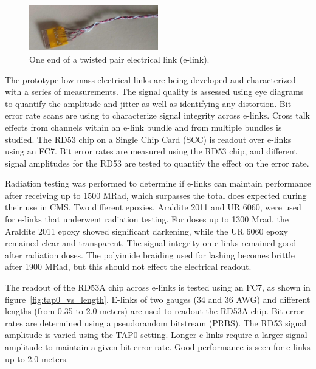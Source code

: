 \documentclass[a4paper,11pt]{article}
\begin{document}
\begin{figure}[htbp]
\centering
\includegraphics[width=0.5\textwidth,origin=c]{../figures/e-link-1.jpg}
\caption{
\label{fig:elink}
One end of a twisted pair electrical link (e-link).
}
\end{figure}




The prototype low-mass electrical links are being developed and characterized with a series of measurements.
The signal quality is assessed using eye diagrams to quantify the amplitude and jitter as well as identifying any distortion.
Bit error rate scans are using to characterize signal integrity across e-links.
Cross talk effects from channels within an e-link bundle and from multiple bundles is studied.
The RD53 chip on a Single Chip Card (SCC) is readout over e-links using an FC7.
Bit error rates are measured using the RD53 chip, and different signal amplitudes for the RD53 are tested to quantify the effect on the error rate.

Radiation testing was performed to determine if e-links can maintain performance after receiving up to 1500 MRad, which surpasses the total does expected during their use in CMS.
Two different epoxies, Araldite 2011 and UR 6060, were used for e-links that underwent radiation testing.
For doses up to 1300 Mrad, the Araldite 2011 epoxy showed significant darkening, while the UR 6060 epoxy remained clear and transparent.
The signal integrity on e-links remained good after radiation doses.
The polyimide braiding used for lashing becomes brittle after 1900 MRad, but this should not effect the electrical readout.


The readout of the RD53A chip across e-links is tested using an FC7, as shown in figure~\ref{fig:tap0_vs_length}.
E-links of two gauges (34 and 36 AWG) and different lengths (from 0.35 to 2.0 meters) are used to readout the RD53A chip.
Bit error rates are determined using a pseudorandom bitstream (PRBS).
The RD53 signal amplitude is varied using the TAP0 setting.
Longer e-links require a larger signal amplitude to maintain a given bit error rate.
Good performance is seen for e-links up to 2.0 meters.
\end{document}
